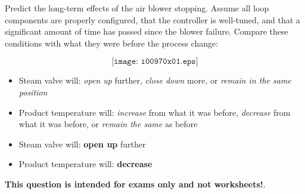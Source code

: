 

Predict the long-term effects of the air blower stopping.  Assume all loop components are properly configured, that the controller is well-tuned, and that a significant amount of time has passed since the blower failure.  Compare these conditions with what they were before the process change:

$$\texttt{[image: i00970x01.eps]}$$

\begin{itemize}
\item{} Steam valve will: {\it open up} further, {\it close down} more, or {\it remain in the same position} 
\vskip 10pt
\item{} Product temperature will: {\it increase} from what it was before, {\it decrease} from what it was before, or {\it remain the same} as before
\end{itemize}







\begin{itemize}
\item{} Steam valve will: {\bf open up} further 
\vskip 5pt
\item{} Product temperature will: {\bf decrease}
\end{itemize}







{\bf This question is intended for exams only and not worksheets!}.



